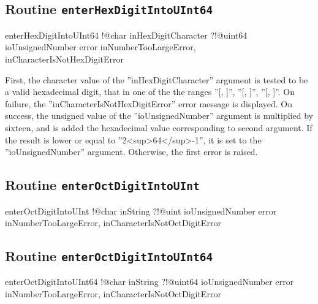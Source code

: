 \subsection{Routine \texttt{enterHexDigitIntoUInt64}}

\begin{galgas3}
enterHexDigitIntoUInt64 !@char inHexDigitCharacter
                        ?!@uint64 ioUnsignedNumber
                        error inNumberTooLargeError,
                              inCharacterIsNotHexDigitError
\end{galgas3}

First, the character value of the ''inHexDigitCharacter'' argument is tested to be a valid hexadecimal digit, that in one of the the ranges ''[\textquotesingle, \textquotesingle]'', ''[\textquotesingle, \textquotesingle]'', ''[\textquotesingle, \textquotesingle]''. On failure, the ''inCharacterIsNotHexDigitError'' error message is displayed. On success, the unsigned value of the ''ioUnsignedNumber'' argument is multiplied by sixteen, and is added the hexadecimal value corresponding to second argument. If the result is lower or equal to ''2<sup>64</sup>-1'', it is set to the ''ioUnsignedNumber'' argument. Otherwise, the first error is raised.

\subsection{Routine \texttt{enterOctDigitIntoUInt}}

\begin{galgas3}
enterOctDigitIntoUInt !@char inString
                      ?!@uint ioUnsignedNumber
                      error inNumberTooLargeError,
                            inCharacterIsNotOctDigitError
\end{galgas3}

\subsection{Routine \texttt{enterOctDigitIntoUInt64}}

\begin{galgas3}
enterOctDigitIntoUInt64 !@char inString
                        ?!@uint64 ioUnsignedNumber
                        error inNumberTooLargeError,
                              inCharacterIsNotOctDigitError
\end{galgas3}

